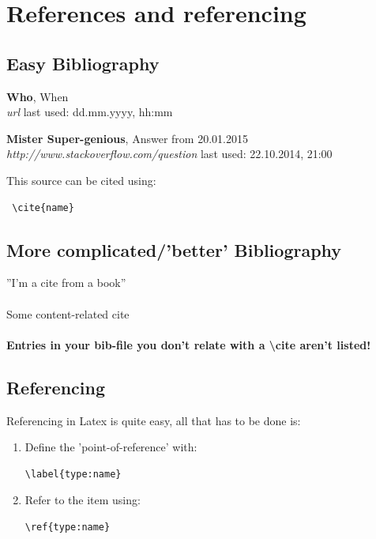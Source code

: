 \documentclass[12pt]{article}
\begin{document}
\section{References and referencing}
\subsection{Easy Bibliography}
\begin{thebibliography}{56}

   \textbf{Who}, When\\
  \textit{url}
  \newline last used: dd.mm.yyyy, hh:mm
 
  \textbf{Mister Super-genious}, Answer from 20.01.2015\\
  \textit{http://www.stackoverflow.com/question}
  \newline last used: 22.10.2014, 21:00
\end{thebibliography}

This source can be cited using:
\begin{lstlisting}
 \cite{name}
\end{lstlisting}
 \cite{name}

\subsection{More complicated/'better' Bibliography}
''I'm a cite from a book'' \cite{bk_key}  \\\\
Some content-related cite \cite{up_key} \\\\
\textbf{\color{red}Entries in your bib-file you don't relate with a \textbackslash{}cite aren't listed!}
\newline
\newline
 

\newpage

\subsection{Referencing}
Referencing in Latex is quite easy, all that has to be done is:
\begin{enumerate}
\item Define the 'point-of-reference' with: 
\begin{lstlisting}
\label{type:name}
\end{lstlisting}
\item Refer to the item using: 
\begin{lstlisting}
\ref{type:name}
\end{lstlisting}
\end{enumerate}
\newpage
\end{document}
